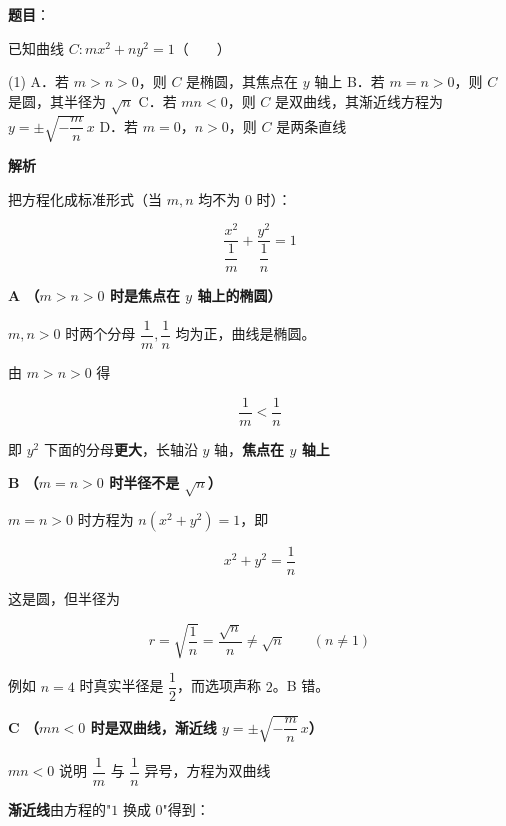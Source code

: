 \begin{answer}

\textbf{题目}：

已知曲线 $C:mx^{2}+ny^{2}=1$\mbox{（　　）}

\begin{gkopts}(1)
\task A．若 $m>n>0$，则 $C$ 是椭圆，其焦点在 $y$ 轴上
\task B．若 $m=n>0$，则 $C$ 是圆，其半径为 $\sqrt n$
\task C．若 $mn<0$，则 $C$ 是双曲线，其渐近线方程为 $y=\pm\sqrt{-\dfrac mn}\,x$
\task D．若 $m=0$，$n>0$，则 $C$ 是两条直线
\end{gkopts}

\textbf{解析}

把方程化成标准形式（当 $m,n$ 均不为 $0$ 时）：

\nopagebreak[4]
\[\frac{x^{2}}{\dfrac1m}+\frac{y^{2}}{\dfrac1n}=1\]

\par\medskip

\textbf{A （$m>n>0$ 时是焦点在 $y$ 轴上的椭圆）}

$m,n>0$ 时两个分母 $\dfrac1m,\dfrac1n$ 均为正，曲线是椭圆。

由 $m>n>0$ 得

\nopagebreak[4]
\[\frac1m<\frac1n\]

即 $y^{2}$ 下面的分母\textbf{更大}，长轴沿 $y$ 轴，\textbf{焦点在 $y$ 轴上} 

\par\medskip

\textbf{B （$m=n>0$ 时半径不是 $\sqrt n$）}

$m=n>0$ 时方程为 $n\left(x^{2}+y^{2}\right)=1$，即

\nopagebreak[4]
\[x^{2}+y^{2}=\frac1n\]

这是圆，但半径为

\nopagebreak[4]
\[r=\sqrt{\frac1n}=\frac{\sqrt n}n\ne\sqrt n\qquad(n\ne1)\]

例如 $n=4$ 时真实半径是 $\dfrac12$，而选项声称 $2$。B 错。

\par\medskip

\textbf{C （$mn<0$ 时是双曲线，渐近线 $y=\pm\sqrt{-\dfrac mn}\,x$）}

$mn<0$ 说明 $\dfrac1m$ 与 $\dfrac1n$ 异号，方程为双曲线 

\textbf{渐近线}由方程的"$1$ 换成 $0$"得到：


\end{answer}
